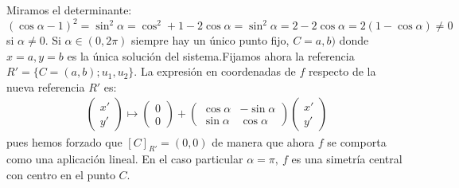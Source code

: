 \documentclass[14pt]{book}
\begin{document}
Miramos el determinante: $(\cos \alpha - 1)^2 = \sin^2 \alpha = \cos^2 + 1 - 2 \cos\alpha = \sin^2 \alpha = 2 - 2\cos \alpha = 2(1 - \cos \alpha) ≠0$ si $\alpha ≠ 0$. Si $\alpha \in (0, 2 \pi)$ siempre hay un único punto fijo, $C = a,b)$ donde $x = a, y = b$ es la única solución del sistema.Fijamos ahora la referencia $R' = \{C = (a,b); u_1, u_2\}$. La expresión en coordenadas de $f$ respecto de la nueva referencia $R'$ es:
\begin{align*}
		\left(\begin{array}{c}
	x' \\ y'
	\end{array}\right) \mapsto \left(\begin{array}{c}
	0 \\ 0
	\end{array}\right) + 
	\left(\begin{array}{cc}
	\cos \alpha & - \sin \alpha \\ \sin \alpha & \cos \alpha
	\end{array}\right)\left(\begin{array}{c}
	x' \\ y'
	\end{array}\right)
\end{align*}
pues hemos forzado que $[C]_{R'} = (0,0)$ de manera que ahora $f$ se comporta como una aplicación lineal. En el caso particular $\alpha = \pi,\ f$ es una simetría central con centro en el punto $C$.
\end{document}
